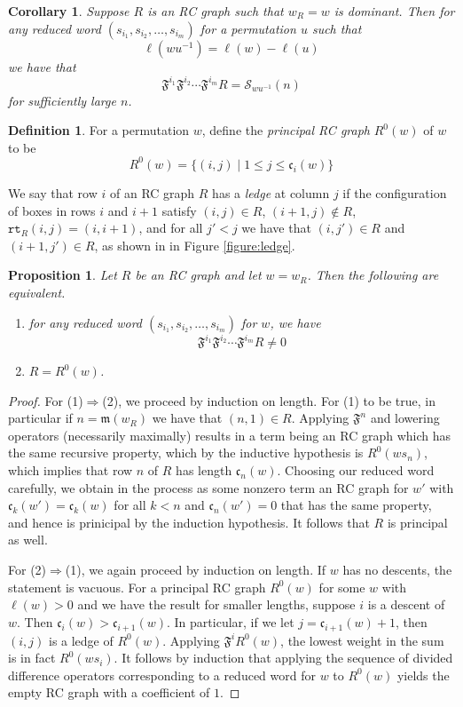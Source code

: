 \documentclass{amsart}
\newtheorem{corollary}[lemma]{Corollary}
\newtheorem{proposition}[lemma]{Proposition}
\theoremstyle{definition}
\newtheorem{definition}[lemma]{Definition}
\theoremstyle{remark}
\numberwithin{equation}{subsection}
\newcommand{\wof}[1]{w_{#1}}
\newcommand{\rcdd}{\mathfrak{F}}
\newcommand{\rtt}{\mathtt{rt}}
\newcommand{\code}{\mathfrak{c}}
\newcommand{\maxd}{\mathfrak{m}}
\begin{document}
\begin{corollary} \label{corollary:generateschubert}
Suppose $R$ is an RC graph such that $\wof{R} = w$ is dominant. Then for any reduced word $(s_{i_1}, s_{i_2}, \ldots, s_{i_m})$ for a permutation $u$ such that
$$\ell(wu^{-1}) = \ell(w) - \ell(u)$$
we have that
$$\rcdd^{i_1}\rcdd^{i_2}\cdots \rcdd^{i_m}R = \mathcal{S}_{wu^{-1}}(n)$$
for sufficiently large $n$.
\end{corollary}


\begin{definition}
For a permutation $w$, define the \emph{principal RC graph} $R^0(w)$ of $w$ to be
$$R^0(w) = \{(i,j)\mid 1\leq j\leq \code_i(w)\}$$

We say that row $i$ of an RC graph $R$ has a \emph{ledge} at column $j$ if the configuration of boxes in rows $i$ and $i+1$ satisfy $(i,j)\in R$, $(i+1,j)\notin  R$, $\rtt_R(i,j)=(i,i+1)$, and for all $j' < j$ we have that $(i,j')\in R$ and $(i+1,j')\in R$, as shown in in Figure \ref{figure:ledge}.
\end{definition}

\begin{proposition} \label{proposition:divdiffprincipal}
Let $R$ be an RC graph and let $w=\wof{R}$. Then the following are equivalent.
\begin{enumerate}
\item for any reduced word $(s_{i_1}, s_{i_2}, \ldots, s_{i_m})$ for $w$, we have
$$\rcdd^{i_1}\rcdd^{i_2}\cdots \rcdd^{i_m}R \neq 0$$

\item $R = R^0(w)$.
\end{enumerate}
\end{proposition}
\begin{proof}
For (1)$\Rightarrow$(2), we proceed by induction on length. For (1) to be true, in particular if $n=\maxd(\wof{R})$ we have that $(n,1)\in R$. Applying $\rcdd^n$ and lowering operators (necessarily maximally) results in a term being an RC graph which has the same recursive property, which by the inductive hypothesis is $R^0(ws_n)$, which implies that row $n$ of $R$ has length $\code_n(w)$. Choosing our reduced word carefully, we obtain in the process as some nonzero term an RC graph for $w'$ with $\code_k(w') = \code_k(w)$ for all $k<n$ and $\code_n(w')=0$ that has the same property, and hence is prinicipal by the induction hypothesis. It follows that $R$ is principal as well.

For (2)$\Rightarrow$(1), we again proceed by induction on length. If $w$ has no descents, the statement is vacuous. For a principal RC graph $R^0(w)$ for some $w$ with $\ell(w)>0$ and we have the result for smaller lengths, suppose $i$ is a descent of $w$. Then $\code_i(w) > \code_{i+1}(w)$. In particular, if we let $j = \code_{i+1}(w) + 1$, then $(i,j)$ is a ledge of $R^0(w)$. Applying $\rcdd^iR^0(w)$, the lowest weight in the sum is in fact $R^0(ws_i)$. It follows by induction that applying the sequence of divided difference operators corresponding to a reduced word for $w$ to $R^0(w)$ yields the empty RC graph with a coefficient of $1$.
\end{proof}
\end{document}
